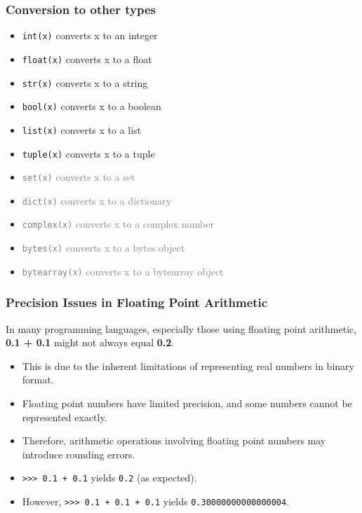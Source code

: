 \documentclass{beamer}
\begin{document}
\begin{frame}
  \frametitle{Conversion to other types}
  \vspace*{-1cm}
  \begin{itemize}
    \item \texttt{int(x)} converts x to an integer
    \item \texttt{float(x)} converts x to a float
    \item \texttt{str(x)} converts x to a string
    \item \texttt{bool(x)} converts x to a boolean
    \item \texttt{list(x)} converts x to a list
    \item \texttt{tuple(x)} converts x to a tuple
    \item \textcolor{gray}{\texttt{set(x)} converts x to a set}
    \item \textcolor{gray}{\texttt{dict(x)} converts x to a dictionary}
    \item \textcolor{gray}{\texttt{complex(x)} converts x to a complex number}
    \item \textcolor{gray}{\texttt{bytes(x)} converts x to a bytes object}
    \item \textcolor{gray}{\texttt{bytearray(x)} converts x to a bytearray object}
  \end{itemize}
\end{frame}

\begin{frame}
  \frametitle{Precision Issues in Floating Point Arithmetic}
  
  In many programming languages, especially those using floating point arithmetic, \textbf{0.1 + 0.1} might not always equal \textbf{0.2}.
  
  \begin{itemize}
    \item This is due to the inherent limitations of representing real numbers in binary format.
    \item Floating point numbers have limited precision, and some numbers cannot be represented exactly.
    \item Therefore, arithmetic operations involving floating point numbers may introduce rounding errors.
  \end{itemize}
\end{frame}
\begin{frame}
  
  \begin{itemize}
    \item \texttt{>>> 0.1 + 0.1} yields \texttt{0.2} (as expected).
    \item However, \texttt{>>> 0.1 + 0.1 + 0.1} yields \texttt{0.30000000000000004}.
  \end{itemize}
\end{frame}
  
\end{document}
